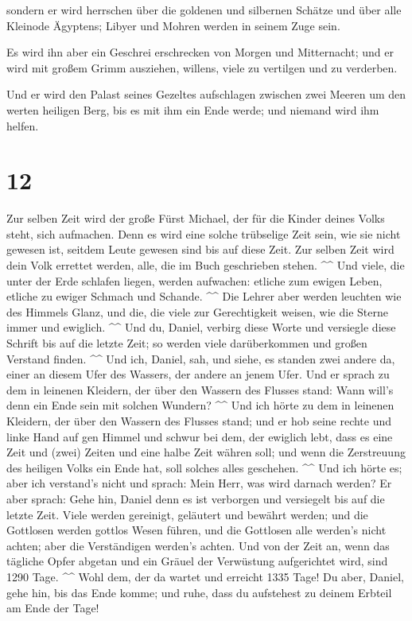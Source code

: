  sondern er wird herrschen über die goldenen und
silbernen Schätze und über alle Kleinode Ägyptens; Libyer und Mohren
werden in seinem Zuge sein.

 Es wird ihn aber ein Geschrei erschrecken von Morgen und
Mitternacht; und er wird mit großem Grimm ausziehen, willens, viele zu
vertilgen und zu verderben.

 Und er wird den Palast seines Gezeltes aufschlagen
zwischen zwei Meeren um den werten heiligen Berg, bis es mit ihm ein
Ende werde; und niemand wird ihm helfen.

\hypertarget{section-11}{%
\section{12}\label{section-11}}

 Zur selben Zeit wird der große Fürst Michael, der für die
Kinder deines Volks steht, sich aufmachen. Denn es wird eine solche
trübselige Zeit sein, wie sie nicht gewesen ist, seitdem Leute gewesen
sind bis auf diese Zeit. Zur selben Zeit wird dein Volk errettet werden,
alle, die im Buch geschrieben stehen. \^{}\^{}  Und viele,
die unter der Erde schlafen liegen, werden aufwachen: etliche zum ewigen
Leben, etliche zu ewiger Schmach und Schande. \^{}\^{} 
Die Lehrer aber werden leuchten wie des Himmels Glanz, und die, die
viele zur Gerechtigkeit weisen, wie die Sterne immer und ewiglich.
\^{}\^{}  Und du, Daniel, verbirg diese Worte und
versiegle diese Schrift bis auf die letzte Zeit; so werden viele
darüberkommen und großen Verstand finden. \^{}\^{}  Und
ich, Daniel, sah, und siehe, es standen zwei andere da, einer an diesem
Ufer des Wassers, der andere an jenem Ufer.  Und er sprach
zu dem in leinenen Kleidern, der über den Wassern des Flusses stand:
Wann will's denn ein Ende sein mit solchen Wundern? \^{}\^{}
 Und ich hörte zu dem in leinenen Kleidern, der über den
Wassern des Flusses stand; und er hob seine rechte und linke Hand auf
gen Himmel und schwur bei dem, der ewiglich lebt, dass es eine Zeit und
(zwei) Zeiten und eine halbe Zeit währen soll; und wenn die Zerstreuung
des heiligen Volks ein Ende hat, soll solches alles geschehen. \^{}\^{}
 Und ich hörte es; aber ich verstand's nicht und sprach:
Mein Herr, was wird darnach werden?  Er aber sprach: Gehe
hin, Daniel denn es ist verborgen und versiegelt bis auf die letzte
Zeit.  Viele werden gereinigt, geläutert und bewährt
werden; und die Gottlosen werden gottlos Wesen führen, und die Gottlosen
alle werden's nicht achten; aber die Verständigen werden's achten.
 Und von der Zeit an, wenn das tägliche Opfer abgetan und
ein Gräuel der Verwüstung aufgerichtet wird, sind 1290 Tage. \^{}\^{}
 Wohl dem, der da wartet und erreicht 1335 Tage!
 Du aber, Daniel, gehe hin, bis das Ende komme; und ruhe,
dass du aufstehest zu deinem Erbteil am Ende der Tage!
